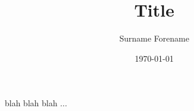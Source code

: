 \documentclass[12pt]{article}
\title{Title}
\author{Surname Forename}
\date{\today}
\begin{document}
\maketitle
\thispagestyle{empty} %

blah blah blah ...
\end{document}
